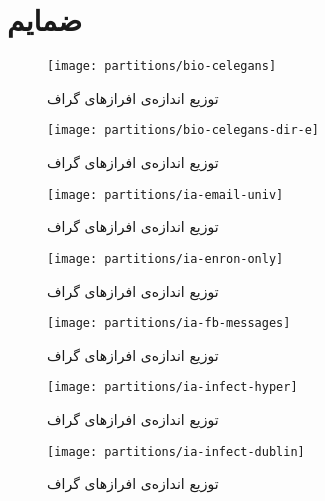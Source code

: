    
\chapter{ضمایم}%
\hypertarget{appendices}{}
\thispagestyle{empty}
\clearpage
{}

\begin{figure}[!ht]
  \centering
  \texttt{[image: partitions/bio-celegans]}
  \caption{توزیع اندازه‌ی افراز‌های گراف
  }
\end{figure}

\begin{figure}[!ht]
  \centering
  \texttt{[image: partitions/bio-celegans-dir-e]}
  \caption{توزیع اندازه‌ی افراز‌های گراف
  }
\end{figure}

\begin{figure}[!ht]
  \centering
  \texttt{[image: partitions/ia-email-univ]}
  \caption{توزیع اندازه‌ی افراز‌های گراف
  }
\end{figure}


\begin{figure}[!ht]
  \centering
  \texttt{[image: partitions/ia-enron-only]}
  \caption{توزیع اندازه‌ی افراز‌های گراف
  }
\end{figure}

\begin{figure}[!ht]
  \centering
  \texttt{[image: partitions/ia-fb-messages]}
  \caption{توزیع اندازه‌ی افراز‌های گراف
  }
\end{figure}

\begin{figure}[!ht]
  \centering
  \texttt{[image: partitions/ia-infect-hyper]}
  \caption{توزیع اندازه‌ی افراز‌های گراف
  }
\end{figure}

\clearpage
\begin{figure}[!ht]
  \centering
  \texttt{[image: partitions/ia-infect-dublin]}
  \caption{توزیع اندازه‌ی افراز‌های گراف
  }
\end{figure}

